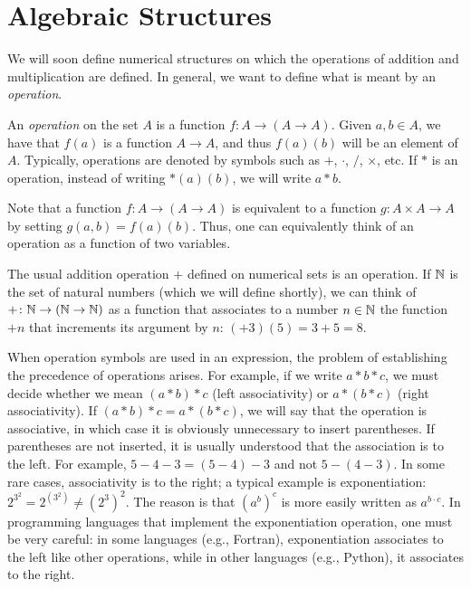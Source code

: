 \section{Algebraic Structures}

We will soon define numerical structures on which the operations of addition and
multiplication are defined. In general, we want to define what is meant by an
\emph{operation}.
%
%

An \emph{operation} on the set $A$ is a function $f\colon A\to(A\to A)$. Given
$a,b\in A$, we have that $f(a)$ is a function $A\to A$, and thus $f(a)(b)$ will
be an element of $A$. Typically, operations are denoted by symbols such as $+$,
$\cdot$, $/$, $\times$, etc. If $*$ is an operation, instead of writing
$*(a)(b)$, we will write $a*b$.

Note that a function $f\colon A\to (A\to A)$ is equivalent to a function
$g\colon A\times A \to A$ by setting $g(a,b) = f(a)(b)$. Thus, one can
equivalently think of an operation as a function of two variables.

\begin{example}
The usual addition operation $+$ defined on numerical sets is an operation. If
${\mathbb N}$ is the set of natural numbers (which we will define shortly), we can think
of $+\colon {\mathbb N}\to ({\mathbb N}\to {\mathbb N})$ as a function that associates to a number $n\in
{\mathbb N}$ the function $+n$ that increments its argument by $n$: $(+3)(5)=3+5=8$.
\end{example}

When operation symbols are used in an expression, the problem of establishing
the precedence of operations arises. For example, if we write $a*b*c$, we must
decide whether we mean $(a*b)*c$ (left associativity) or $a*(b*c)$ (right
associativity). If $(a*b)*c=a*(b*c)$, we will say that the operation is
associative, in which case it is obviously unnecessary to insert parentheses. If
parentheses are not inserted, it is usually understood that the association is
to the left. For example, $5-4-3 = (5-4)-3$ and not $5-(4-3)$. In some rare
cases, associativity is to the right; a typical example is exponentiation:
$2^{3^2} = 2^{(3^2)} \neq (2^3)^2$. The reason is that $(a^b)^c$ is more easily
written as $a^{b\cdot c}$. In programming languages that implement the
exponentiation operation, one must be very careful: in some languages (e.g.,
Fortran), exponentiation associates to the left like other operations, while in
other languages (e.g., Python), it associates to the right.

